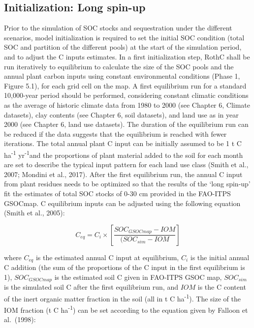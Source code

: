 \documentclass[
  10pt,
  b5paper,
]{book}
\begin{document}
\hypertarget{initialization-long-spin-up}{%
\subsection{Initialization: Long spin-up}\label{initialization-long-spin-up}}

Prior to the simulation of SOC stocks and sequestration under the different scenarios, model initialization is required to set the initial SOC condition (total SOC and partition of the different pools) at the start of the simulation period, and to adjust the C inputs estimates.
In a first initialization step, RothC shall be run iteratively to equilibrium to calculate the size of the SOC pools and the annual plant carbon inputs using constant environmental conditions (Phase 1, Figure 5.1), for each grid cell on the map. A first equilibrium run for a standard 10,000-year period should be performed, considering constant climatic conditions as the average of historic climate data from 1980 to 2000 (see Chapter 6, Climate datasets), clay contents (see Chapter 6, soil datasets), and land use as in year 2000 (see Chapter 6, land use datasets). The duration of the equilibrium run can be reduced if the data suggests that the equilibrium is reached with fewer iterations. The total annual plant C input can be initially assumed to be 1 t C ha\textsuperscript{-1} yr\textsuperscript{-1}and the proportions of plant material added to the soil for each month are set to describe the typical input pattern for each land use class (Smith et al., 2007; Mondini et al., 2017).
After the first equilibrium run, the annual C input from plant residues needs to be optimized so that the results of the `long spin-up' fit the estimates of total SOC stocks of 0-30 cm provided in the FAO-ITPS GSOCmap. C equilibrium inputs can be adjusted using the following equation (Smith et al., 2005):

\begin{equation}
\tag{5.1}
C_{eq}=C_i \times[\frac{SOC_{GSOCmap}-IOM}{(SOC_{sim}-IOM}]                                              
\end{equation}

where \(C_{eq}\) is the estimated annual C input at equilibrium, \(C_i\) is the initial annual C addition (the sum of the proportions of the C input in the first equilibrium is 1), \(SOC_{GSOCmap}\) is the estimated soil C given in FAO-ITPS GSOC map, \(SOC_{sim}\) is the simulated soil C after the first equilibrium run, and \(IOM\) is the C content of the inert organic matter fraction in the soil (all in t C ha\textsuperscript{-1}). The size of the IOM fraction (t C ha\textsuperscript{-1}) can be set according to the equation given by Falloon et al.~(1998):
\end{document}
